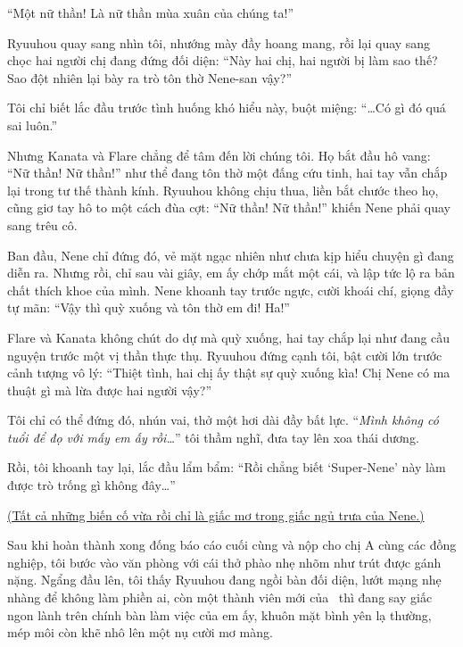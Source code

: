 \documentclass[../main.tex]{subfiles}
\begin{document}
``Một nữ thần! Là nữ thần mùa xuân của chúng ta!''


Ryuuhou quay sang nhìn tôi, nhướng mày đầy hoang mang, rồi lại quay sang chọc hai người chị đang đứng đối diện: ``Này hai chị, hai người bị làm sao thế? Sao đột nhiên lại bày ra trò tôn thờ Nene-san vậy?''

Tôi chỉ biết lắc đầu trước tình huống khó hiểu này, buột miệng: ``\dots Có gì đó quá sai luôn.''

Nhưng Kanata và Flare chẳng để tâm đến lời chúng tôi. Họ bắt đầu hô vang: ``Nữ thần! Nữ thần!'' như thể đang tôn thờ một đấng cứu tinh, hai tay vẫn chắp lại trong tư thế thành kính. Ryuuhou không chịu thua, liền bắt chước theo họ, cũng giơ tay hô to một cách đùa cợt: ``Nữ thần! Nữ thần!'' khiến Nene phải quay sang trêu cô.

Ban đầu, Nene chỉ đứng đó, vẻ mặt ngạc nhiên như chưa kịp hiểu chuyện gì đang diễn ra. Nhưng rồi, chỉ sau vài giây, em ấy chớp mắt một cái, và lập tức lộ ra bản chất thích khoe của mình. Nene khoanh tay trước ngực, cười khoái chí, giọng đầy tự mãn: ``Vậy thì quỳ xuống và tôn thờ em đi! Ha!''

Flare và Kanata không chút do dự mà quỳ xuống, hai tay chắp lại như đang cầu nguyện trước một vị thần thực thụ. Ryuuhou đứng cạnh tôi, bật cười lớn trước cảnh tượng vô lý: ``Thiệt tình, hai chị ấy thật sự quỳ xuống kìa! Chị Nene có ma thuật gì mà lừa được hai người vậy?''

Tôi chỉ có thể đứng đó, nhún vai, thở một hơi dài đầy bất lực. ``\textit{Mình không có tuổi để đọ với mấy em ấy rồi\dots}'' tôi thầm nghĩ, đưa tay lên xoa thái dương.

Rồi, tôi khoanh tay lại, lắc đầu lẩm bẩm: ``Rồi chẳng biết `Super-Nene' này làm được trò trống gì không đây\dots''
\omk

\begin{center}
  \uline{(Tất cả những biến cố vừa rồi chỉ là giấc mơ trong giấc ngủ trưa của Nene.)}
\end{center}

Sau khi hoàn thành xong đống báo cáo cuối cùng và nộp cho chị A cùng các đồng nghiệp, tôi bước vào văn phòng với cái thở phào nhẹ nhõm như trút được gánh nặng. Ngẩng đầu lên, tôi thấy Ryuuhou đang ngồi bàn đối diện, lướt mạng nhẹ nhàng để không làm phiền ai, còn một thành viên mới của \hll\ thì đang say giấc ngon lành trên chính bàn làm việc của em ấy, khuôn mặt bình yên lạ thường, mép môi còn khẽ nhô lên một nụ cười mơ màng.
\end{document}
